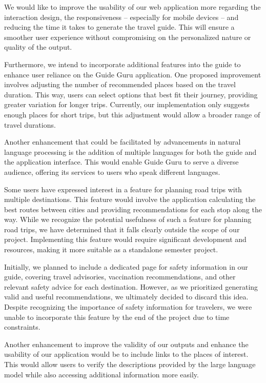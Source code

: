 \documentclass[english,notitlepage,smartquotes]{hgbreport}
\begin{document}
We would like to improve the usability of our web application more regarding the interaction design, the responsiveness -- especially for mobile devices -- and reducing the time it takes to generate the travel guide. This will ensure a smoother user experience without compromising on the personalized nature or quality of the output.

Furthermore, we intend to incorporate additional features into the guide to enhance user reliance on the Guide Guru application. One proposed improvement involves adjusting the number of recommended places based on the travel duration. This way, users can select options that best fit their journey, providing greater variation for longer trips. Currently, our implementation only suggests enough places for short trips, but this adjustment would allow a broader range of travel durations.
 
Another enhancement that could be facilitated by advancements in natural language processing is the addition of multiple languages for both the guide and the application interface. This would enable Guide Guru to serve a diverse audience, offering its services to users who speak different languages.

Some users have expressed interest in a feature for planning road trips with multiple destinations. This feature would involve the application calculating the best routes between cities and providing recommendations for each stop along the way. While we recognize the potential usefulness of such a feature for planning road trips, we have determined that it falls clearly outside the scope of our project. Implementing this feature would require significant development and resources, making it more suitable as a standalone semester project.

Initially, we planned to include a dedicated page for safety information in our guide, covering travel advisories, vaccination recommendations, and other relevant safety advice for each destination. However, as we prioritized generating valid and useful recommendations, we ultimately decided to discard this idea. Despite recognizing the importance of safety information for travelers, we were unable to incorporate this feature by the end of the project due to time constraints.

Another enhancement to improve the validity of our outputs and enhance the usability of our application would be to include links to the places of interest. This would allow users to verify the descriptions provided by the large language model while also accessing additional information more easily.
\end{document}
